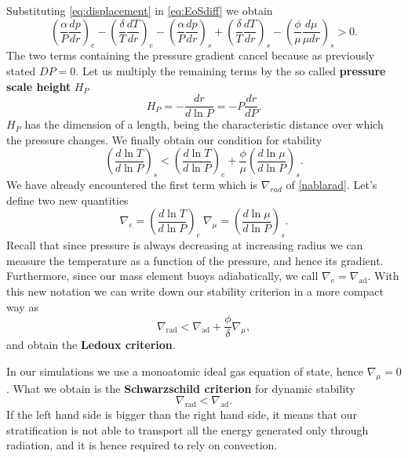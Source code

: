 Substituting \ref{eq:displacement} in \ref{eq:EoSdiff} we obtain
\begin{equation}
	\left (\frac{\alpha}{P} \frac{dp}{dr}\right )_e - \left ( \frac{\delta}{T}\frac{dT}{dr}\right )_e -  \left (\frac{\alpha}{P} \frac{dp}{dr}\right )_s +  \left ( \frac{\delta}{T}\frac{dT}{dr}\right )_s -  \left ( \frac{\phi}{\mu}\frac{d \mu}{\mu dr}\right )_s>0 .
\end{equation}
The two terms containing the pressure gradient cancel because as previously stated $DP=0$. Let us multiply the remaining terms by the so called \textbf{pressure scale height} $H_P$
\begin{equation}\label{scaleheight}
	H_P=-\frac{dr}{d \ln P}= - P \frac{dr}{dP}.
\end{equation}
$H_P$ has the dimension of a length, being the characteristic distance over which the pressure changes.
We finally obtain our condition for stability
\begin{equation}\label{criterionstab}
	\left (   \frac{d \ln T}{d \ln P}    \right )_s <  \left (   \frac{d \ln T}{d \ln P}   \right )_e +  \frac{\phi}{\mu} \left (   \frac{d \ln \mu}{d \ln P}    \right )_s.
\end{equation}
We have already encountered the first term which is $\nabla_{rad}$ of \ref{nablarad}.
Let's define two new quantities
\begin{equation}\label{nablas}
	\nabla_{e} = \left (  \frac{d \ln T}{d \ln P}   \right )_e \  \nabla_{\mu} = \left (  \frac{d \ln \mu}{d \ln P}   \right )_s.
\end{equation}
Recall that since pressure is always decreasing at increasing radius we can measure the temperature as a function of the pressure, and hence its gradient. Furthermore, since our mass element buoys adiabatically, we call $\nabla_e=\nabla_{\mathrm{ad}}$. 
With this new notation we can write down our stability criterion in a more compact way as
\begin{equation}\label{stabcritcomp}
	\nabla_{\mathrm{rad}} < \nabla_{\mathrm{ad}} + \frac{\phi}{\delta} \nabla_{\mu},
\end{equation}
and obtain the \textbf{Ledoux criterion}. 

In our simulations we use a monoatomic ideal gas equation of state, hence $\nabla_{\mu}=0$. What we obtain is the \textbf{Schwarzschild criterion} for dynamic stability
\begin{equation}\label{schwarzschild}
	\nabla_{\mathrm{rad}}<\nabla_{\mathrm{ad}}.
\end{equation}
If the left hand side is bigger than the right hand side, it means that our stratification is not able to transport all the energy generated only through radiation, and it is hence required to rely on convection. 

